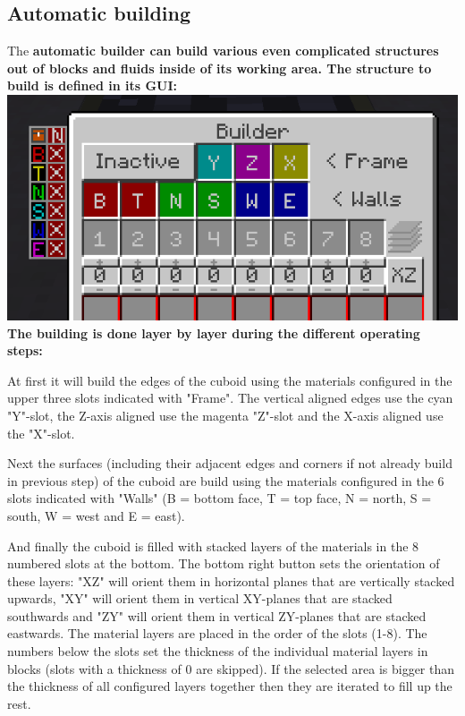 \documentclass[11pt]{article} %
\begin{document}
\subsection{Automatic building}
The \bf automatic builder \rm can build various even complicated structures out of blocks and fluids inside of its working area. The structure to build is defined in its GUI: \\
\includegraphics[width = \textwidth]{builder} \\
The building is done layer by layer during the different operating steps: 

At first it will build the edges of the cuboid using the materials configured in the upper three slots indicated with "Frame". The vertical aligned edges use the cyan "Y"-slot, the Z-axis aligned use the magenta "Z"-slot and the X-axis aligned use the "X"-slot. 

Next the surfaces (including their adjacent edges and corners if not already build in previous step) of the cuboid are build using the materials configured in the 6 slots indicated with "Walls" (B = bottom face, T = top face, N = north, S = south, W = west and E = east).

And finally the cuboid is filled with stacked layers of the materials in the 8 numbered slots at the bottom. The bottom right button sets the orientation of these layers: "XZ" will orient them in horizontal planes that are vertically stacked upwards, "XY" will orient them in vertical XY-planes that are stacked southwards and "ZY" will orient them in vertical ZY-planes that are stacked eastwards. The material layers are placed in the order of the slots (1-8). The numbers below the slots set the thickness of the individual material layers in blocks (slots with a thickness of 0 are skipped). If the selected area is bigger than the thickness of all configured layers together then they are iterated to fill up the rest.
\end{document}
